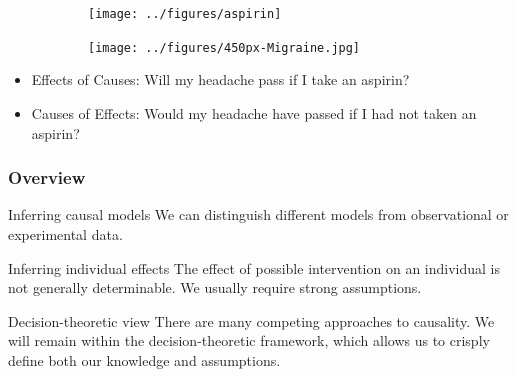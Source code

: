 \begin{frame}
  \begin{example}
    \begin{figure}[H]
      \centering
      \begin{subfigure}{\fwidth}
        \texttt{[image: ../figures/aspirin]}
      \end{subfigure}
      \begin{subfigure}{\fwidth}
        \texttt{[image: ../figures/450px-Migraine.jpg]}
      \end{subfigure}
    \end{figure}
    \begin{itemize}
    \item Effects of \alert{Causes}: Will \alert{my} headache pass \alert{if I take} an aspirin?
    \item \alert{Causes} of Effects: Would \alert{my} headache have passed if I had \alert{not taken} an aspirin?
    \end{itemize}
  \end{example}
\end{frame}

\begin{frame}
  \frametitle{Overview}
  \begin{block}{Inferring causal models}
    We can distinguish different \alert{models} from observational or experimental data.
  \end{block}

  \begin{block}{Inferring individual effects}
    The effect of possible intervention on an individual is not generally determinable. We usually require strong assumptions.
  \end{block}
  
  \begin{block}{Decision-theoretic view}
    There are many competing approaches to causality. We will remain within the decision-theoretic framework, which allows us to crisply define both our knowledge and assumptions.
  \end{block}
\end{frame}

